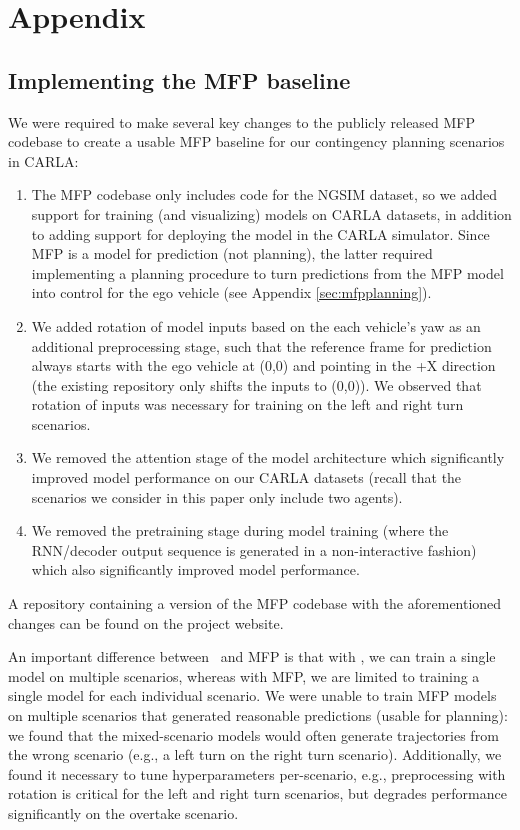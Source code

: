 

\clearpage
\appendix
\section{Appendix}




\subsection{Implementing the MFP baseline}

We were required to make several key changes to the publicly released MFP codebase to create a usable MFP baseline for our contingency planning scenarios in CARLA:
\begin{enumerate}
    \item The MFP codebase only includes code for the NGSIM dataset, so we added support for training (and visualizing) models on CARLA datasets, in addition to adding support for deploying the model in the CARLA simulator. Since MFP is a model for prediction (not planning), the latter required implementing a planning procedure to turn predictions from the MFP model into control for the ego vehicle (see Appendix \ref{sec:mfpplanning}).
    \item We added rotation of model inputs based on the each vehicle's yaw as an additional preprocessing stage, such that the reference frame for prediction always starts with the ego vehicle at (0,0) and pointing in the +X direction (the existing repository only shifts the inputs to (0,0)). We observed that rotation of inputs was necessary for training on the left and right turn scenarios.
    \item We removed the attention stage of the model architecture which significantly improved model performance on our CARLA datasets (recall that the scenarios we consider in this paper only include two agents).
    \item We removed the pretraining stage during model training (where the RNN/decoder output sequence is generated in a non-interactive fashion) which also significantly improved model performance.
\end{enumerate}
A repository containing a version of the MFP codebase with the aforementioned changes can be found on the project website. 

An important difference between \ours ~and MFP is that with \ours, we can train a single model on multiple scenarios, whereas with MFP, we are limited to training a single model for each individual scenario. We were unable to train MFP models on multiple scenarios that generated reasonable predictions (usable for planning): we found that the mixed-scenario models would often generate trajectories from the wrong scenario (e.g., a left turn on the right turn scenario). Additionally, we found it necessary to tune hyperparameters per-scenario, e.g., preprocessing with rotation is critical for the left and right turn scenarios, but degrades performance significantly on the overtake scenario.

